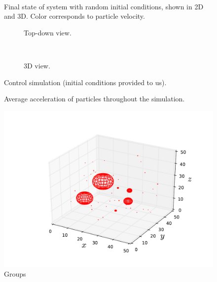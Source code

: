 \documentclass[10pt]{article}
\begin{document}
\begin{figure}[htbp]
\centering
\begin{subfigure}{\textwidth}
\centering

\end{subfigure} \\
\begin{subfigure}{\textwidth}
\centering

\end{subfigure}
\caption{Final state of system with random initial conditions, shown in 2D and 3D. Color corresponds to particle velocity.}
\label{fig:randomic}
\end{figure}

\begin{figure}[htbp]
\centering
\begin{subfigure}{\textwidth}
\centering

\caption{Top-down view.}
\end{subfigure} \\
\begin{subfigure}{\textwidth}
\centering

\caption{3D view.}
\end{subfigure}
\caption{Control simulation (initial conditions provided to us).}
\label{fig:control}
\end{figure}

\begin{figure}[htbp]
\centering

\label{fig:accel}
\caption{Average acceleration of particles throughout the simulation.}
\end{figure}

\begin{figure}[htbp]
\centering
\includegraphics{Control_Groups.pdf}
\caption{Groups}
\label{fig:groups}
\end{figure}
\end{document}
